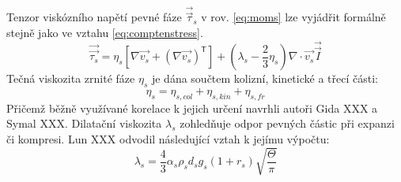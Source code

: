 Tenzor viskózního napětí pevné fáze $\vec{\vec{\tau}}_{s}$ v rov. \ref{eq:moms} lze vyjádřit formálně stejně jako ve vztahu \ref{eq:comptenstress}. 
\begin{equation}
	\vec{\vec{\tau_{s}}} = \eta_{s} \left[ \nabla \vec{v_{s}} +  \left( \nabla \vec{v_{s}} \right)^{\mathsf{T}}\right] +  \left( \lambda_{s} -\frac{2}{3} \eta_{s} \right) \nabla \cdot \vec{v_{s}} \vec{\vec{I}}
	\label{eq:solidstress}
\end{equation}
Tečná viskozita zrnité fáze $\eta_{s}$ je dána součtem kolizní, kinetické a třecí části:
\begin{equation}
	\eta_{s} = \eta_{s,col}  + \eta_{s,kin} + \eta_{s,fr} 
	\label{eq:nys}
\end{equation}
Přičemž běžně využívané korelace k jejich určení navrhli autoři Gida XXX a Symal XXX. Dilatační viskozita $\lambda_{s}$ zohledňuje odpor pevných částic při expanzi či kompresi. Lun XXX odvodil následující vztah k jejímu výpočtu:
\begin{equation}
	\lambda_{s} = \frac{4}{3}\alpha_{s}\rho_{s}d_{s}g_{s}\left(1 + r_{s} \right)\sqrt{\frac{\Theta}{\pi}}
	\label{eq:dilvis}
\end{equation}
 
